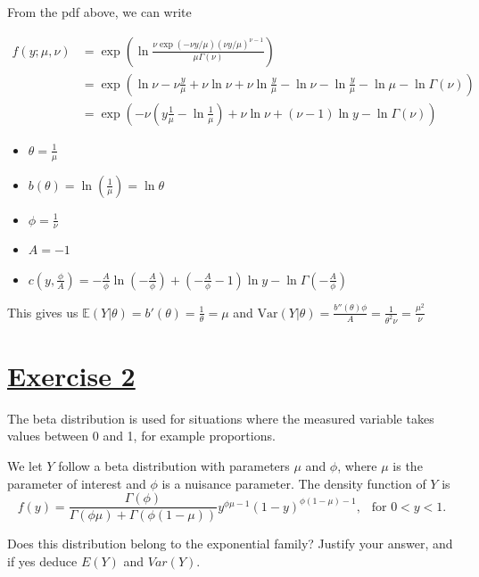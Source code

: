 \documentclass[a4paper,12pt]{article}
\def\op{\left(}
\def\cp{\right)}
\begin{document}
{\color{blue} 

From the pdf above, we can write

\begin{align*}
  f(y;\mu,\nu)&=\exp\left(\ln\frac{\nu \exp(-\nu y/\mu)(\nu y/\mu)^{\nu-1}}{\mu\Gamma(\nu)}\right)\\
&= \exp\left(\ln \nu - \nu \frac{y}{\mu} + \nu\ln\nu+\nu\ln\frac{y}{\mu}-\ln\nu-\ln\frac{y}{\mu}-\ln\mu-\ln\Gamma(\nu)\right)\\
&= \exp\left(-\nu( y\frac{1}{\mu} - \ln\frac{1}{\mu}) + \nu\ln\nu+(\nu-1)\ln y - \ln\Gamma(\nu) \right) 
\end{align*}







\begin{itemize}
  \item $\displaystyle \theta = \frac{1}{\mu}$ 
  \item $\displaystyle b(\theta) = \ln(\frac{1}{\mu}) = \ln \theta$ 
  \item $\displaystyle \phi  = \frac{1}{\nu}$ 
  \item $\displaystyle A = -1 $ 
  \item $\displaystyle c\op y , \frac{\phi}{A}\cp = 
  -\frac{A}{\phi} \ln \op - \frac{A}{\phi}\cp 
  + \op - \frac{A}{\phi} -1\cp\ln y - \ln \Gamma \op -\frac{A}{\phi}\cp  $ 
    \end{itemize}
    
    This gives us $\mathbb{E}(Y|\theta)=b'(\theta)= \frac{1}{\theta}=\mu$   and $\text{Var}(Y|\theta)=\frac{b''(\theta)\phi}{A}=\frac{1}{\theta^2\nu}=\frac{\mu^2}{\nu}$ 
}


\section{\underline{Exercise 2} }

The beta distribution is used for situations where the measured variable takes values between 0 and 1, for example proportions.

We let $Y$ follow a beta distribution with parameters $\mu$ and  $\phi$, where $\mu$ is the parameter of interest and $\phi$ is a nuisance parameter. The density function of $Y$ is
$$f(y) = \frac{\Gamma(\phi)}{\Gamma(\phi \mu) + \Gamma(\phi (1-\mu) )} y^{\phi \mu - 1} (1-y)^{\phi (1-\mu) -1},  \ \  \mbox{ for } 0 < y < 1.$$

Does this distribution belong to the exponential family? Justify your answer, and if yes deduce $E(Y)$ and $Var(Y)$.
\end{document}
